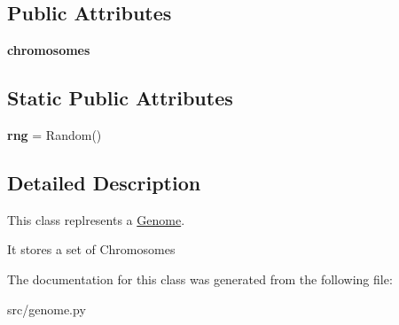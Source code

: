 \subsection*{Public Attributes}
\begin{DoxyCompactItemize}
\item 
\mbox{\label{classsrc_1_1genome_1_1Genome_a30af4774efdf1f4c3fc764385ccd1198}} 
{\bfseries chromosomes}
\end{DoxyCompactItemize}
\subsection*{Static Public Attributes}
\begin{DoxyCompactItemize}
\item 
\mbox{\label{classsrc_1_1genome_1_1Genome_ac46e4749cd7d21dd226746a6904d6e23}} 
{\bfseries rng} = Random()
\end{DoxyCompactItemize}


\subsection{Detailed Description}
This class replresents a \mbox{\hyperlink{classsrc_1_1genome_1_1Genome}{Genome}}. 

It stores a set of Chromosomes 

The documentation for this class was generated from the following file\+:\begin{DoxyCompactItemize}
\item 
src/genome.\+py\end{DoxyCompactItemize}
